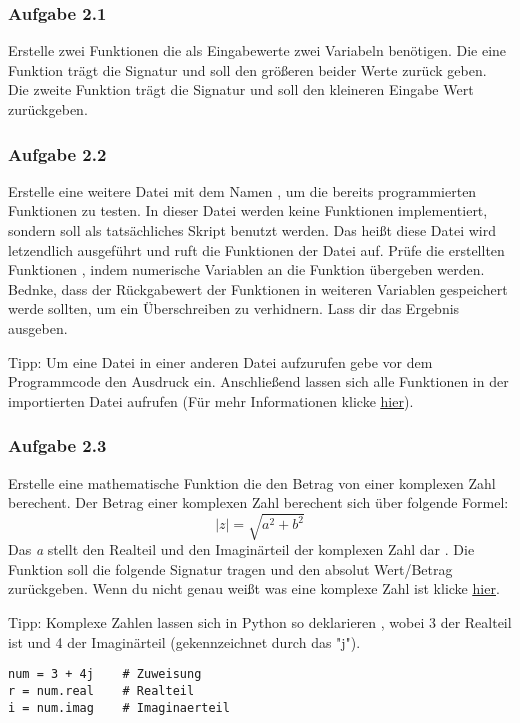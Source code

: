 \subsubsection{Aufgabe 2.1}
Erstelle zwei Funktionen die als Eingabewerte zwei Variabeln benötigen. Die eine Funktion trägt die Signatur  und soll den größeren beider Werte zurück geben. Die zweite Funktion trägt die Signatur  und soll den kleineren Eingabe Wert zurückgeben.
\subsubsection{Aufgabe 2.2}
Erstelle eine weitere Datei mit dem Namen , um die bereits programmierten Funktionen zu testen. In dieser Datei werden keine Funktionen implementiert, sondern soll als tatsächliches Skript benutzt werden. Das heißt diese Datei wird letzendlich ausgeführt und ruft die Funktionen der  Datei auf. Prüfe die erstellten Funktionen , indem numerische Variablen an die Funktion übergeben werden. Bednke, dass der Rückgabewert der Funktionen in weiteren Variablen gespeichert werde sollten, um ein Überschreiben zu verhidnern. Lass dir das Ergebnis ausgeben.

Tipp: Um eine Datei in einer anderen Datei aufzurufen gebe vor dem Programmcode den Ausdruck  ein. Anschließend lassen sich alle Funktionen in der importierten Datei aufrufen (Für mehr Informationen klicke \underline{\href{https://stackoverflow.com/questions/2349991/how-to-import-other-python-files}{hier}}).

\subsubsection{Aufgabe 2.3}
Erstelle eine mathematische Funktion die den Betrag von einer komplexen Zahl berechent. Der Betrag einer komplexen Zahl berechent sich über folgende Formel:
\begin{equation}
|z| = \sqrt{a^2 + b^2}
\end{equation}
Das \textit{a} stellt den Realteil und  den Imaginärteil der komplexen Zahl dar . Die Funktion soll die folgende Signatur tragen  und den absolut Wert/Betrag zurückgeben.
 Wenn du nicht genau weißt was eine komplexe Zahl ist klicke \underline{\href{https://de.wikipedia.org/wiki/Komplexe_Zahl}{hier}}. 

Tipp: Komplexe Zahlen lassen sich in Python so deklarieren , wobei 3 der Realteil ist und 4 der Imaginärteil (gekennzeichnet durch das "j"). 
\begin{lstlisting}
num = 3 + 4j 	# Zuweisung
r = num.real	# Realteil
i = num.imag	# Imaginaerteil
\end{lstlisting}
